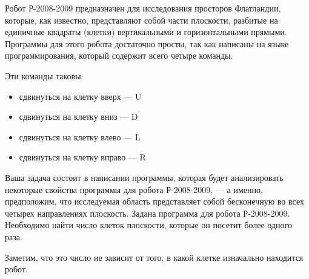 Робот Р-2008-2009 предназначен для исследования просторов Флатландии, которые, как известно, представляют собой части плоскости, разбитые на единичные квадраты (клетки) вертикальными и горизонтальными прямыми. Программы для этого робота достаточно просты, так как написаны
на языке программирования, который содержит всего четыре команды.

Эти команды таковы:
\begin{itemize}
\item сдвинуться на клетку вверх --- U
\item сдвинуться на клетку вниз --- D
\item сдвинуться на клетку влево --- L
\item сдвинуться на клетку вправо --- R
\end{itemize}

Ваша задача состоит в написании программы, которая будет анализировать некоторые свойства
программы для робота Р-2008-2009, --- а именно, предположим, что исследуемая область 
представляет собой бесконечную во всех четырех направлениях плоскость. Задана программа для робота
Р-2008-2009. Необходимо найти число клеток плоскости, которые он посетит более одного раза.

Заметим, что это число не зависит от того, в какой клетке изначально находится робот.
